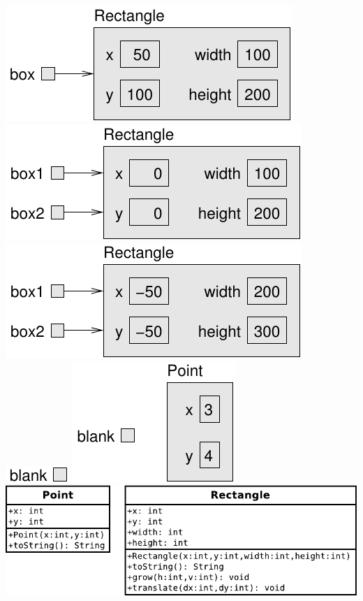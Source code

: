 \documentclass[12pt]{book}
\begin{document}
\clearpage%
\includegraphics{./figs/rectangle2.pdf}
\clearpage%
\includegraphics{./figs/aliasing.pdf}
\clearpage%
\includegraphics{./figs/aliasing2.pdf}
\clearpage%
\includegraphics{./figs/reference2.pdf}
\clearpage%
\includegraphics{./figs/reference3.pdf}
\clearpage%
\includegraphics{./figs/point-rect.pdf}
\end{document}
